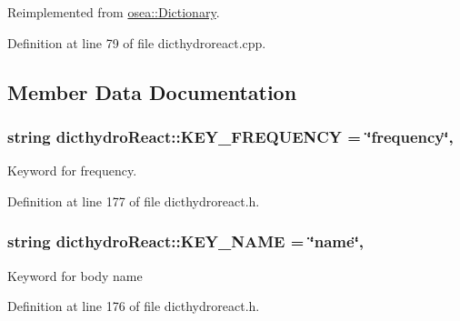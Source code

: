 Reimplemented from \hyperlink{classosea_1_1_dictionary_ae96470181c8b1762204493fa45e96d7c}{osea\-::\-Dictionary}.



Definition at line 79 of file dicthydroreact.\-cpp.



\subsection{Member Data Documentation}
\hypertarget{classosea_1_1dicthydro_react_a281e3ae225b1959152f22979c12a60a5}{
\subsubsection[{K\-E\-Y\-\_\-\-F\-R\-E\-Q\-U\-E\-N\-C\-Y}]{\setlength{\rightskip}{0pt plus 5cm}string dicthydro\-React\-::\-K\-E\-Y\-\_\-\-F\-R\-E\-Q\-U\-E\-N\-C\-Y = \char`\"{}frequency\char`\"{}\hspace{0.3cm}{\ttfamily [static]}, {\ttfamily [protected]}}}\label{classosea_1_1dicthydro_react_a281e3ae225b1959152f22979c12a60a5}
Keyword for frequency. 

Definition at line 177 of file dicthydroreact.\-h.

\hypertarget{classosea_1_1dicthydro_react_a489f3104a318cd418c2646f63d3b0f97}{
\subsubsection[{K\-E\-Y\-\_\-\-N\-A\-M\-E}]{\setlength{\rightskip}{0pt plus 5cm}string dicthydro\-React\-::\-K\-E\-Y\-\_\-\-N\-A\-M\-E = \char`\"{}name\char`\"{}\hspace{0.3cm}{\ttfamily [static]}, {\ttfamily [protected]}}}\label{classosea_1_1dicthydro_react_a489f3104a318cd418c2646f63d3b0f97}
Keyword for body name 

Definition at line 176 of file dicthydroreact.\-h.

